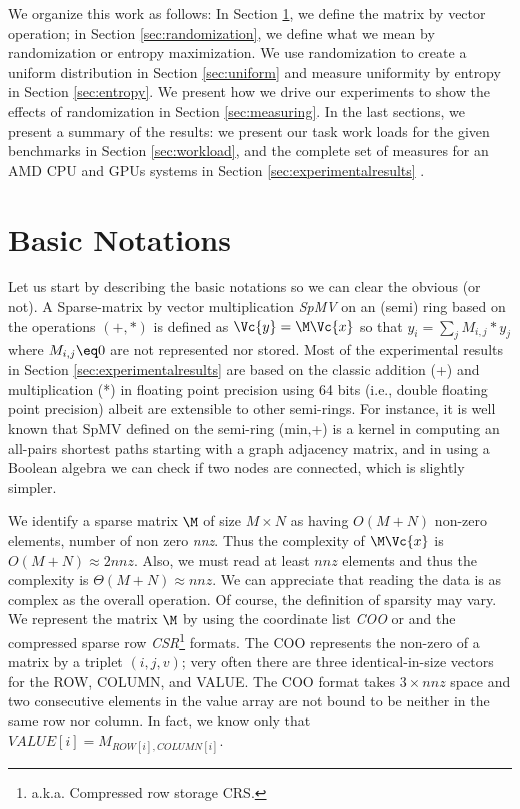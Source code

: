 \documentclass[manuscript,screen]{acmart}
\begin{document}
We organize this work as follows: In Section \ref{sec:notations}, we
define the matrix by vector operation; in Section
\ref{sec:randomization}, we define what we mean by randomization or
entropy maximization. We use randomization to create a uniform
distribution in Section \ref{sec:uniform} and measure uniformity
by entropy in Section \ref{sec:entropy}. We present how we drive our
experiments to show the effects of randomization in Section
\ref{sec:measuring}. In the last sections, we present a summary of the
results: we present our task work loads for the given benchmarks in Section
\ref{sec:workload}, and the complete set of measures for an AMD CPU
and GPUs systems in Section \ref{sec:experimentalresults} .

\section{Basic Notations}
\label{sec:notations}
Let us start by describing the basic notations so we can clear the
obvious (or not).  A Sparse-matrix by vector multiplication {\em SpMV}
on an (semi) ring based on the operations $(+,*)$ is defined as
$\Vc{y} = \M \Vc{x}$ so that $y_i = \sum_j M_{i,j}*y_j$ where $M_{i,j}
\eq 0$ are not represented nor stored. Most of the experimental
results in Section \ref{sec:experimentalresults} are based on the
classic addition (+) and multiplication (*) in floating point
precision using 64 bits (i.e., double floating point precision) albeit
are extensible to other semi-rings.  For instance, it is well known
that SpMV defined on the semi-ring (min,+) is a kernel in computing an
all-pairs shortest paths starting with a graph adjacency matrix, and
in using a Boolean algebra we can check if two nodes are connected,
which is slightly simpler.

We identify a sparse matrix $\M$ of size $M\times N$ as having
$O(M+N)$ non-zero elements, number of non zero {\em nnz}. Thus the
complexity of $\M \Vc{x}$ is $O(M+N) \approx 2nnz$. Also, we must read
at least $nnz$ elements and thus the complexity is $\Theta(M+N)
\approx nnz$. We can appreciate that reading the data is as complex as
the overall operation. Of course, the definition of sparsity may
vary. We represent the matrix $\M$ by using the coordinate list {\em
  COO} or and the compressed sparse row {\em
  CSR}\footnote{a.k.a. Compressed row storage {\rm CRS}.}
formats. The COO represents the non-zero of a matrix by a triplet
$(i,j,v)$; very often there are three identical-in-size vectors for
the ROW, COLUMN, and VALUE. The COO format takes $3\times nnz$ space
and two consecutive elements in the value array are not bound to be
neither in the same row nor column. In fact, we know only that
$VALUE[i] = M_{ROW[i],COLUMN[i]}$.
\end{document}
